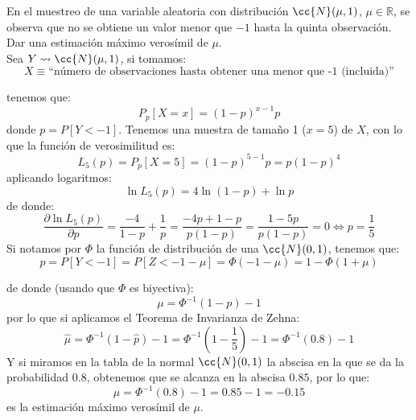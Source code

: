 \begin{ejercicio}
    En el muestreo de una variable aleatoria con distribución $\cc{N}(\mu,1)$, $\mu \in \mathbb{R}$, se observa que no se obtiene un valor menor que $-1$ hasta la quinta observación. Dar una estimación máximo verosímil de $\mu$.\\

    \noindent
    Sea $Y\rightsquigarrow\cc{N}(\mu, 1)$, si tomamos:
    \begin{equation*}
        X\equiv \text{``número de observaciones hasta obtener una menor que -1 (incluida)''}
    \end{equation*}

    tenemos que:
    \begin{equation*}
        P_p[X=x] = {(1-p)}^{x-1}p
    \end{equation*}
    donde $p= P[Y<-1]$. Tenemos una muestra de tamaño 1 ($x=5$) de $X$, con lo que la función de verosimilitud es:
    \begin{equation*}
        L_5(p) = P_p[X=5] = {(1-p)}^{5-1}p = p{(1-p)}^{4}
    \end{equation*}
    aplicando logaritmos:
    \begin{equation*}
        \ln L_5(p) = 4\ln(1-p) + \ln p
    \end{equation*}
    de donde:
    \begin{equation*}
        \dfrac{\partial \ln L_5(p)}{\partial p} = \frac{-4}{1-p}+\frac{1}{p} = \frac{-4p+1-p}{p(1-p)} = \frac{1-5p}{p(1-p)} = 0 \Longleftrightarrow p = \frac{1}{5}
    \end{equation*}
    Si notamos por $\Phi$ la función de distribución de una $\cc{N}(0,1)$, tenemos que:
    \begin{equation*}
        p = P[Y< -1] = P[Z<-1-\mu] = \Phi(-1-\mu) = 1-\Phi(1+\mu)
    \end{equation*}

    de donde (usando que $\Phi$ es biyectiva):
    \begin{equation*}
        \mu = \Phi^{-1}\left(1-p\right) - 1
    \end{equation*}
    por lo que si aplicamos el Teorema de Invarianza de Zehna:
    \begin{equation*}
        \hat{\mu} = \Phi^{-1}(1-\hat{p}) - 1 = \Phi^{-1}\left(1-\frac{1}{5}\right) - 1 = \Phi^{-1}(0.8) - 1
    \end{equation*}
    Y si miramos en la tabla de la normal $\cc{N}(0,1)$ la abscisa en la que se da la probabilidad $0.8$, obtenemos que se alcanza en la abscisa $0.85$, por lo que:
    \begin{equation*}
        \hat{\mu} = \Phi^{-1}(0.8) - 1 = 0.85 - 1 = -0.15
    \end{equation*}
    es la estimación máximo verosímil de $\mu$.
\end{ejercicio}


